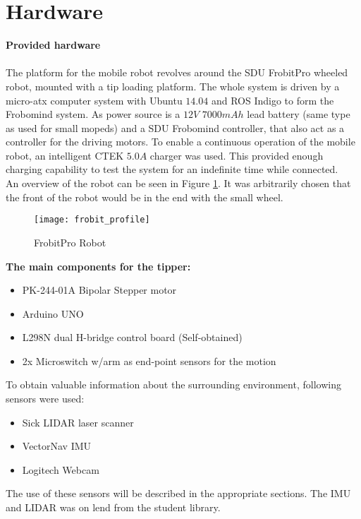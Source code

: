 \section{Hardware} %
\label{sec:mr_hardware}

\textbf{Provided hardware}
\\
\\
The platform for the mobile robot revolves around the SDU FrobitPro wheeled robot, mounted with a tip loading platform. The whole system is driven by a micro-atx computer system with Ubuntu $14.04$ and ROS Indigo to form the Frobomind system. As power source is a $12V$ $7000mAh$ lead battery (same type as used for small mopeds) and a SDU Frobomind controller, that also act as a controller for the driving motors. To enable a continuous operation of the mobile robot, an intelligent CTEK $5.0A$ charger was used. This provided enough charging capability to test the system for an indefinite time while connected.\\ An overview of the robot can be seen in Figure \ref{fig:frobit}. It was arbitrarily chosen that the front of the robot would be in the end with the small wheel.\\
\begin{figure}[H]
	\centering
	\texttt{[image: frobit\_profile]}
	\caption{FrobitPro Robot}
	\label{fig:frobit}
	\end{figure}
\textbf{The main components for the tipper:}
\begin{itemize}
	\item PK-244-01A Bipolar Stepper motor
	\item Arduino UNO
	\item L298N dual H-bridge control board (Self-obtained)
	\item 2x Microswitch w/arm as end-point sensors for the motion
\end{itemize}   

To obtain valuable information about the surrounding environment, following sensors were used:
\begin{itemize}
	\item Sick LIDAR laser scanner
	\item VectorNav	 IMU
	\item Logitech Webcam
\end{itemize} 

The use of these sensors will be described in the appropriate sections. The IMU and LIDAR was on lend from the student library.\\

